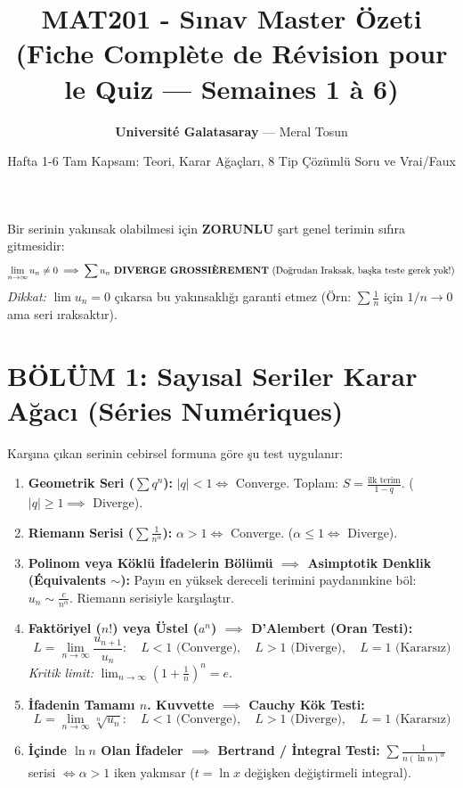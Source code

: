 \documentclass[11pt,a4paper]{article}
\title{\vspace{-1.2cm}\textbf{\Huge MAT201 - Sınav Master Özeti}\\\Large (Fiche Complète de Révision pour le Quiz --- Semaines 1 à 6)}
\author{\textbf{Université Galatasaray} --- Meral Tosun}
\date{\small Hafta 1-6 Tam Kapsam: Teori, Karar Ağaçları, 8 Tip Çözümlü Soru ve Vrai/Faux}
\begin{document}
\shorthandoff{=}
\maketitle
\vspace{-0.5cm}

\begin{tcolorbox}[colback=red!5!white,colframe=red!75!black,title=\textbf{0. REFLEKS: Genel Terim Testi (Condition Nécessaire)}]
Bir serinin yakınsak olabilmesi için \textbf{ZORUNLU} şart genel terimin sıfıra gitmesidir:
\[ \lim_{n \to \infty} u_n \neq 0 \implies \sum u_n \text{ \textbf{DIVERGE GROSSIÈREMENT} (Doğrudan Iraksak, başka teste gerek yok!)} \]
\textit{Dikkat:} $\lim u_n = 0$ çıkarsa bu yakınsaklığı garanti etmez (Örn: $\sum \frac{1}{n}$ için $1/n \to 0$ ama seri ıraksaktır).
\end{tcolorbox}

\section*{BÖLÜM 1: Sayısal Seriler Karar Ağacı (Séries Numériques)}

\begin{tcolorbox}[colback=blue!5!white,colframe=blue!75!black,title=\textbf{A. Pozitif Terimli Seriler ($u_n \ge 0$)}]
Karşına çıkan serinin cebirsel formuna göre şu test uygulanır:
\begin{enumerate}[leftmargin=*]
    \item \textbf{Geometrik Seri ($\sum q^n$):} 
    $|q| < 1 \iff$ Converge. Toplam: $S = \frac{\text{ilk terim}}{1 - q}$. ($|q| \ge 1 \implies$ Diverge).
    \item \textbf{Riemann Serisi ($\sum \frac{1}{n^\alpha}$):} 
    $\alpha > 1 \iff$ Converge. ($\alpha \le 1 \iff$ Diverge).
    \item \textbf{Polinom veya Köklü İfadelerin Bölümü $\implies$ Asimptotik Denklik (Équivalents $\sim$):}
    Payın en yüksek dereceli terimini paydanınkine böl: $u_n \sim \frac{c}{n^\alpha}$. Riemann serisiyle karşılaştır.
    \item \textbf{Faktöriyel ($n!$) veya Üstel ($a^n$) $\implies$ D'Alembert (Oran Testi):}
    \[ L = \lim_{n \to \infty} \frac{u_{n+1}}{u_n} : \quad L < 1 \text{ (Converge)}, \quad L > 1 \text{ (Diverge)}, \quad L=1 \text{ (Kararsız)} \]
    \textit{Kritik limit:} $\lim_{n \to \infty} \left(1 + \frac{1}{n}\right)^n = e$.
    \item \textbf{İfadenin Tamamı $n$. Kuvvette $\implies$ Cauchy Kök Testi:}
    \[ L = \lim_{n \to \infty} \sqrt[n]{u_n} : \quad L < 1 \text{ (Converge)}, \quad L > 1 \text{ (Diverge)}, \quad L=1 \text{ (Kararsız)} \]
    \item \textbf{İçinde $\ln n$ Olan İfadeler $\implies$ Bertrand / İntegral Testi:}
    $\sum \frac{1}{n(\ln n)^\alpha}$ serisi $\iff \alpha > 1$ iken yakınsar ($t = \ln x$ değişken değiştirmeli integral).
\end{enumerate}
\end{tcolorbox}
\end{document}
